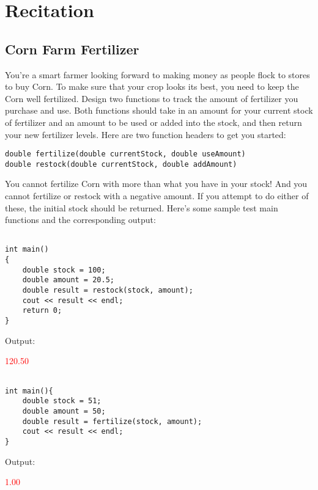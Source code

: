         
        


\section{Recitation}

\subsection{Corn Farm Fertilizer}
You're a smart farmer looking forward to making money as people flock to stores to buy Corn. To make sure that your crop looks its best, you need to keep the Corn well fertilized. Design two functions to track the amount of fertilizer you purchase and use. Both functions should take in an amount for your current stock of fertilizer and an amount to be used or added into the stock, and then return your new fertilizer levels. Here are two function headers to get you started:
\begin{verbatim}
double fertilize(double currentStock, double useAmount)
double restock(double currentStock, double addAmount)
\end{verbatim}
You cannot fertilize Corn with more than what you have in your stock! And you cannot fertilize or restock with a negative amount. If you attempt to do either of these, the initial stock should be returned. Here’s some sample test main functions and the corresponding output:

\begin{sample}
\begin{verbatim}

int main()
{
    double stock = 100;
    double amount = 20.5;
    double result = restock(stock, amount);
    cout << result << endl;
    return 0;
}
\end{verbatim}
    Output:
    
    \textcolor{red}{120.50}

\end{sample}

\begin{sample}

\begin{verbatim}

int main(){
    double stock = 51;
    double amount = 50;
    double result = fertilize(stock, amount);
    cout << result << endl;
}
\end{verbatim}

    Output:
    
    \textcolor{red}{1.00}
 
\end{sample}

